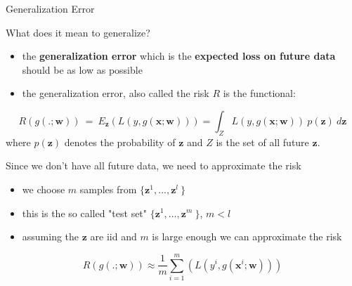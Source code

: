 \documentclass[xcolor=pdftex,dvipsnames,table]{beamer}
\begin{document}
\begin{frame}{Generalization Error}
		\par
		\scriptsize
		\textcolor{NavyBlue}{What does it mean to generalize? \\}
		\begin{itemize}
			\item the \textbf{generalization error} which is the \textbf{expected loss on future data} should be as low as possible
			\item the generalization error, also called the risk $R$ is the functional:
		\end{itemize}
		
		\begin{equation*}
		R(g(.;\mathbf{w})) \ = \ E_{\mathbf{z}} \left(L(y,g(\mathbf{x};\mathbf{w})) \right) =  \int_Z L(y,g(\mathbf{x};\mathbf{w})) \ p(\mathbf{z}) \ d\mathbf{z}
		\end{equation*}
		where $p(\mathbf{z})$ denotes the probability of $\mathbf{z}$ and $Z$ is the set of all future $\mathbf{z}$.
		
		
		\textcolor{NavyBlue}{Since we don't have all future data, we need to approximate the risk\\}
		\begin{itemize}
			\item we choose $m$ samples from $\{ \mathbf{z}^1, \ldots, \mathbf{z}^l\ \}$ 
			\item this is the so called "test set" $\{ \mathbf{z}^1, \ldots, \mathbf{z}^m\ \}$, $m < l$
			\item assuming the $\mathbf{z}$ are iid and $m$ is large enough we can approximate the risk 
		\end{itemize}		
		
		\begin{equation*}
				R(g(.;\mathbf{w})) \approx \frac{1}{m} \sum_{i=1}^{m}   \left(L(y^i,g(\mathbf{x}^i;\mathbf{w})) \right)
		\end{equation*}
			
\end{frame}


\end{document}
